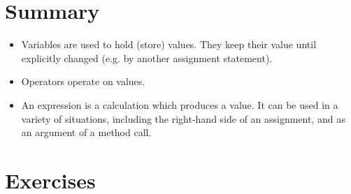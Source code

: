 	\section{Summary}
		\begin{itemize}
			\item Variables are used to hold (store) values. They keep their value until explicitly changed (e.g. by another assignment statement).
			\item Operators operate on values.
			\item An expression is a calculation which produces a value. It can be used in a variety of situations, including the right-hand side of an assignment, and as an argument of a method call.
		\end{itemize}

	\section{Exercises}
